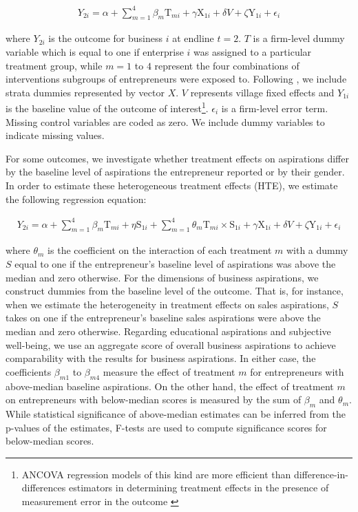 \documentclass[11.5pt]{article}
\begin{document}
{\begin{align}
    {Y}_{2i} = \alpha + \sum\limits_{m=1}^4 \beta_m \text{T}_{mi} + \gamma \text{X}_{1i} + \delta {V} + \zeta \text{Y}_{1i} + \epsilon_i \label{eq:1}
\end{align}

where ${Y}_{2i}$ is the outcome for business $i$ at endline $t=2$. $T$ is a firm-level dummy variable which is equal to one if enterprise $i$ was assigned to a particular treatment group, while $m = 1$ to $4$ represent the four combinations of interventions subgroups of entrepreneurs were exposed to. Following \citet{Bruhn2009}, we include strata dummies represented by vector $X$. $V$ represents village fixed effects and $Y_{1i}$ is the baseline value of the outcome of interest\footnote{ANCOVA regression models of this kind are more efficient than difference-in-differences estimators in determining treatment effects in the presence of measurement error in the outcome \citep{McKenzie2012}}. $\epsilon_i$ is a firm-level error term. Missing control variables are coded as zero. We include dummy variables to indicate missing values.

For some outcomes, we investigate whether treatment effects on aspirations differ by the baseline level of aspirations the entrepreneur reported or by their gender. In order to estimate these heterogeneous treatment effects (HTE), we estimate the following regression equation:

\begin{align}
    {Y}_{2i} = \alpha + \sum\limits_{m=1}^4 \beta_m \text{T}_{mi} + \eta \text{S}_{1i} + \sum\limits_{m=1}^4 \theta_m \text{T}_{mi} \times \text{S}_{1i} + \gamma \text{X}_{1i} + \delta {V} + \zeta \text{Y}_{1i} + \epsilon_i \label{eq:2}
\end{align}

where $\theta_m$ is the coefficient on the interaction of each treatment $m$ with a dummy $S$ equal to one if the entrepreneur's baseline level of aspirations was above the median and zero otherwise. For the dimensions of business aspirations, we construct dummies from the baseline level of the outcome. That is, for instance, when we estimate the heterogeneity in treatment effects on sales aspirations, $S$ takes on one if the entrepreneur's baseline sales aspirations were above the median and zero otherwise. Regarding educational aspirations and subjective well-being, we use an aggregate score of overall business aspirations to achieve comparability with the results for business aspirations. In either case, the coefficients $\beta_{m1}$ to $\beta_{m4}$ measure the effect of treatment $m$ for entrepreneurs with above-median baseline aspirations. On the other hand, the effect of treatment $m$ on entrepreneurs with below-median scores is measured by the sum of $\beta_m$ and $\theta_m$. While statistical significance of above-median estimates can be inferred from the p-values of the estimates, F-tests are used to compute significance scores for below-median scores.



}
\end{document}
